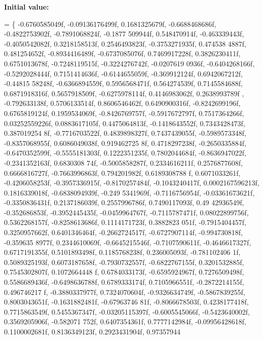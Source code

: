 {\bfseries Initial value\+:}
\begin{DoxyCode}
=
\{
    -0.6760585049f, -0.09136176499f, 0.1681325679f, -0.6688468686f, -0.4822753902f, -0.7891068824f, -0.1877
      509944f, 0.548470914f, -0.463339443f, -0.4050542082f, 0.3218158513f, 0.2546493823f, -0.3753271935f, 0.474538
      4887f, 0.481254652f, -0.8934416489f,
    -0.6737085076f, 0.7469917228f, 0.3826230411f, 0.6751013678f, -0.7248119515f, -0.3224276742f, -0.0207619
      0936f, -0.6404268166f, -0.5292028444f, 0.7151414636f, -0.6144655059f, -0.369912124f, 0.6942067212f, -0.44815
      58248f, -0.6366894559f, 0.5956568471f,
    0.564274539f, 0.7145584688f, 0.6871918316f, 0.5657918509f, -0.6275978114f, 0.4146983062f, 0.2638993789f
      , -0.792633138f, 0.5706133514f, 0.8606546462f, 0.6490900316f, -0.8242699196f, 0.6765819124f, 0.1959534069f, 
      -0.8426769757f, -0.5917672797f,
    0.7517364266f, 0.03252559226f, 0.0883617105f, 0.4475064813f, -0.1418643552f, 0.7343428473f, 0.387019254
      8f, -0.7716703522f, 0.4839898327f, 0.7437439055f, -0.5989573348f, -0.8357068955f, 0.6086049038f, 0.919462725
      8f, 0.4718297238f, -0.2650335884f,
    -0.6470352599f, -0.5555181303f, 0.1222351235f, 0.7802044684f, -0.8636947022f, -0.2341352163f, 0.6830308
      74f, -0.5005858287f, 0.2334616211f, 0.2576877608f, 0.6666816727f, -0.7663996863f, 0.794201982f, 0.6189308788
      f, 0.6071033261f, -0.4206058253f,
    -0.3957336915f, -0.8170257484f, -0.1043240417f, 0.0002167596213f, 0.1816339018f, -0.6838094939f, -0.249
      5341969f, -0.7116756954f, -0.03361673621f, -0.3350836431f, 0.2137186039f, 0.2557996786f, 0.7490117093f, 0.49
      42936549f, -0.352686853f, -0.3952445435f,
    -0.0459964767f, -0.7115787471f, 0.08022899756f, 0.5362268157f, -0.8258613686f, 0.1114171723f, 0.3882823
      051f, -0.7915404457f, 0.3250957662f, 0.6401346464f, -0.2662724517f, -0.6727907114f, -0.994730818f, -0.359635
      8977f, 0.2344610069f, -0.6645215546f,
    -0.7107590611f, -0.4646617327f, 0.6717191355f, 0.5101893498f, 0.1185768238f, 0.236005093f, -0.781102406
      1f, 0.5089325193f, 0.6073187658f, -0.7930732557f, -0.6822767155f, 0.3201532885f, 0.7545302807f, 0.1072664448
      f, 0.6784033173f, -0.6595924967f,
    0.7276509498f, 0.5586689436f, -0.6498636788f, 0.6789333174f, 0.7105966551f, -0.2872214155f, 0.496746217
      f, -0.3880337977f, 0.7324070604f, -0.9326634749f, -0.5867839255f, 0.8003043651f, -0.1631882481f, -0.67963746
      81f, -0.8066678503f, 0.4238177418f,
    0.7715863549f, 0.5455367347f, -0.03205115397f, -0.6005545066f, -0.5423640002f, 0.3569205906f, -0.582071
      752f, 0.6407354361f, 0.7777142984f, -0.09956428618f, 0.1100002681f, 0.8136349123f, 0.2923431904f, 0.97357944

\end{DoxyCode}
